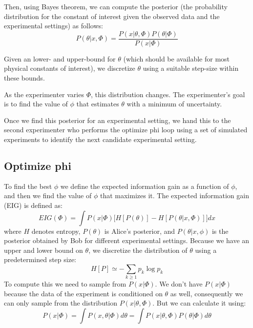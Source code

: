 \documentclass[10pt,journal,compsoc]{IEEEtran}
\begin{document}
Then, using Bayes theorem, we can compute the posterior (the probability distribution for the constant of interest given the observed data and the experimental settings) as follows:
\begin{equation}
P(\theta|x,\Phi)=\frac{P(x|\theta,\Phi)P(\theta|\Phi)}{P(x|\Phi)}
\end{equation}

Given an lower- and upper-bound for $\theta$ (which should be available for most physical constants of interest), we discretize $\theta$ using a suitable step-size within these bounds.

As the experimenter varies $\Phi$, this distribution changes. The experimenter's goal is to find the value of $\phi$ that estimates $\theta$ with a minimum of uncertainty.

Once we find this posterior for an experimental setting, we hand this to the second experimenter who performs the optimize phi loop using a set of simulated experiments to identify the next candidate experimental setting.

\subsection{Optimize phi}

To find the best $\phi$ we define the expected information gain as a function of $\phi$, and then we find the value of $\phi$ that maximizes it. The expected information gain (EIG) is defined as:
\begin{equation}\label{infGain}
EIG(\Phi) =\int P(x|\Phi)\Big[ H[P(\theta)]-H[P(\theta|x,\Phi)]\Big]dx
\end{equation}
where $H$ denotes entropy, $P(\theta)$ is Alice's posterior, and $P(\theta | x, \phi)$ is the posterior obtained by Bob for different experimental settings. Because we have an upper and lower bound on $\theta$, we discretize the distribution of $\theta$ using a predetermined step size:
\begin{equation}
H[P]\simeq-\sum_{k\geq 1}p_k \log{p_k}
\end{equation}
To compute this we need to sample from $ P(x|\Phi)$. We don't have $P(x|\Phi)$ because the data of the experiment is conditioned on $\theta$ as well, consequently we can only sample from the distribution $P(x |\theta,\Phi)$. But we can calculate it using:
\begin{equation}
P(x|\Phi) = \int P(x,\theta | \Phi)d \theta = 
\int P(x| \theta , \Phi) P(\theta | \Phi)d \theta 
\end{equation}
\end{document}
